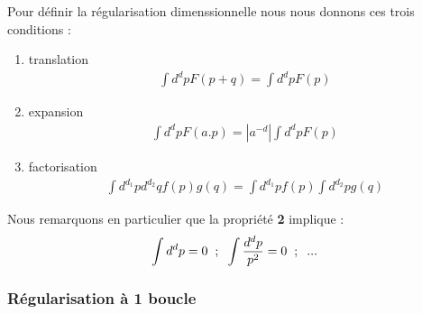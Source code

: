 \documentclass[a4paper,11pt]{article} %
\theoremstyle{plain}
\theoremstyle{definition}
\theoremstyle{remark}
\numberwithin{equation}{section}
\numberwithin{equation}{subsection}
\numberwithin{figure}{section}
\begin{document}
\noindent
Pour définir la régularisation dimenssionnelle nous nous donnons ces trois conditions :
\begin{enumerate}
\item translation
          \begin{eqnarray*}
           \int d^{d}p F(p+q) = \int d^{d}p F(p)
          \end{eqnarray*}
\item expansion
          \begin{eqnarray*}
           \int d^{d}p F(a.p) = |a^{-d} | \int d^{d}p F(p)
          \end{eqnarray*}
\item factorisation
          \begin{eqnarray*}
           \int d^{d_1}p d^{d_2}q f(p) g(q) = \int d^{d_1}p f(p)  \int d^{d_2}p g(q)
          \end{eqnarray*}
\end{enumerate}

\noindent
Nous remarquons en particulier que la propriété  \textbf{2} implique :
\begin{eqnarray*}
 \int d^{d}p = 0 \hspace{2mm} ;  \hspace{2mm} \int \frac{d^{d}p}{p^2} = 0 \hspace{2mm} ;  \hspace{2mm} ...
\end{eqnarray*}

    \subsubsection{Régularisation à 1 boucle}
\end{document}
